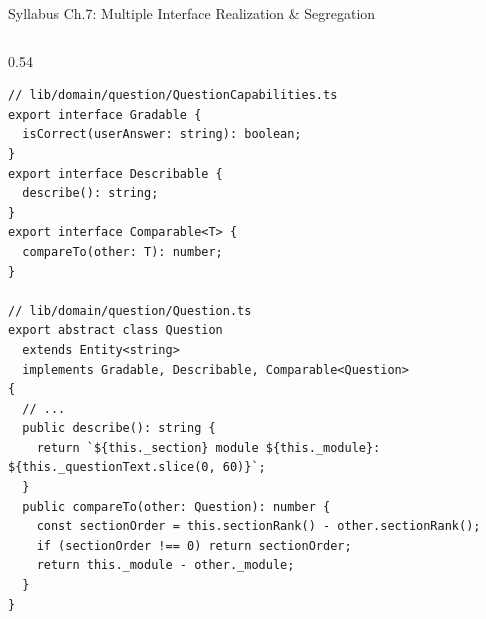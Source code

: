 ﻿\documentclass[aspectratio=169,10pt,t]{beamer}
\begin{document}
\begin{frame}[fragile]{Syllabus Ch.7: Multiple Interface Realization \& Segregation}
  \vspace{-1.2mm}
  \begin{columns}[T,onlytextwidth]
    \begin{column}{0.54\textwidth}
      \begin{codeBox}
\begin{lstlisting}
// lib/domain/question/QuestionCapabilities.ts
export interface Gradable {
  isCorrect(userAnswer: string): boolean;
}
export interface Describable {
  describe(): string;
}
export interface Comparable<T> {
  compareTo(other: T): number;
}

// lib/domain/question/Question.ts
export abstract class Question
  extends Entity<string>
  implements Gradable, Describable, Comparable<Question>
{
  // ...
  public describe(): string {
    return `${this._section} module ${this._module}: ${this._questionText.slice(0, 60)}`;
  }
  public compareTo(other: Question): number {
    const sectionOrder = this.sectionRank() - other.sectionRank();
    if (sectionOrder !== 0) return sectionOrder;
    return this._module - other._module;
  }
}
\end{lstlisting}
      \end{codeBox}
    \end{column}


\end{columns}
\end{frame}
\end{document}
